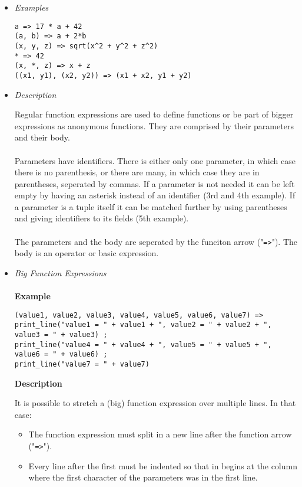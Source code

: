 \documentclass{article}
\begin{document}
\begin{itemize}
\item \textit{Examples}

\begin{verbatim}
a => 17 * a + 42
(a, b) => a + 2*b
(x, y, z) => sqrt(x^2 + y^2 + z^2)
* => 42
(x, *, z) => x + z
((x1, y1), (x2, y2)) => (x1 + x2, y1 + y2)
\end{verbatim}

\item \textit{Description}

Regular function expressions are used to define functions or be part of bigger
expressions as anonymous functions. They are comprised by their parameters and
their body.
\\\\
Parameters have identifiers. There is either only one parameter, in which case
there is no parenthesis, or there are many, in which case they are in
parentheses, seperated by commas. If a parameter is not needed it can be left
empty by having an asterisk instead of an identifier (3rd and 4th example).
If a parameter is a tuple itself it can be matched further by using parentheses
and giving identifiers to its fields (5th example).
\\\\
The parameters and the body are seperated by the funciton arrow
("\verb|=>|"). The body is an operator or basic expression.

\item \textit{Big Function Expressions}\\\\
\textbf{Example}

\begin{verbatim}
(value1, value2, value3, value4, value5, value6, value7) => 
print_line("value1 = " + value1 + ", value2 = " + value2 + ", value3 = " + value3) ;
print_line("value4 = " + value4 + ", value5 = " + value5 + ", value6 = " + value6) ;
print_line("value7 = " + value7)
\end{verbatim}

\textbf{Description}

It is possible to stretch a (big) function expression over multiple lines.
In that case:
\begin{itemize}
\item
The function expression must split in a new line after the function arrow
("\verb|=>|").

\item
Every line after the first must be indented so that in begins at the column 
where the first character of the parameters was in the first line.


\end{itemize}
\end{itemize}
\end{document}
